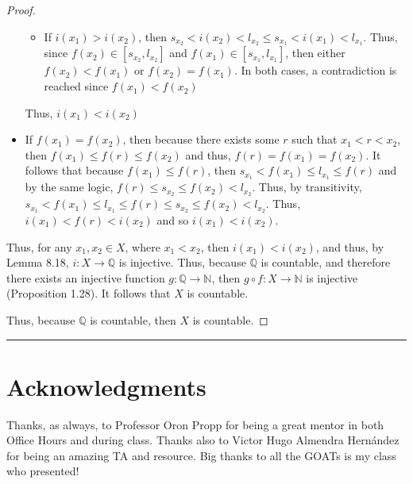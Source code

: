 \documentclass[openany, amssymb, psamsfonts]{amsart}
\newcommand{\bbN}{\mathbb{N}}
\newcommand{\bbQ}{\mathbb{Q}}
\newcommand{\arr}{\longrightarrow}
\theoremstyle{definition}
\numberwithin{equation}{section}
\begin{document}
\begin{proof}
\begin{itemize}
\begin{itemize}
        \item If $i(x_1) > i(x_2)$, then $s_{x_2}< i(x_2)<l_{x_2} \leq s_{x_1}< i(x_1)<l_{x_1}$. Thus, since $f(x_2) \in [s_{x_2}, l_{x_2}]$ and $f(x_1) \in [s_{x_1}, l_{x_1}]$, then either $f(x_2)< f(x_1)$ or $f(x_2) = f(x_1)$. In both cases, a contradiction is reached since $f(x_1)< f(x_2)$
    \end{itemize}
    Thus, $i(x_1)< i(x_2)$
    \item If $f(x_1) = f(x_2)$, then because there exists some $r$ such that $x_1<r<x_2$, then $f(x_1)\leq f(r)\leq f(x_2)$ and thus, $f(r) = f(x_1) = f(x_2)$. It follows that because $f(x_1)\leq f(r)$, then $s_{x_1}<f(x_1)\leq l_{x_1}\leq f(r)$ and by the same logic, $f(r)\leq s_{x_2}\leq f(x_2)<l_{x_2}$. Thus, by transitivity, $s_{x_1}<f(x_1)\leq l_{x_1}\leq f(r) \leq s_{x_2}\leq f(x_2)<l_{x_2}$. Thus, $i(x_1)< f(r)< i(x_2)$ and so $i(x_1)< i(x_2)$. 
\end{itemize}
Thus, for any $x_1, x_2 \in X$, where $x_1<x_2$, then $i(x_1)<i(x_2)$, and thus, by Lemma 8.18, $i\colon X \arr \bbQ$ is injective. Thus, because 
$\bbQ$ is countable, and therefore there exists an injective function $g \colon \bbQ \arr \bbN$, then $g \circ f : X\arr \bbN$ is injective (Proposition 1.28). It follows that $X$ is countable. 


Thus, because $\bbQ$ is countable, then $X$ is countable. 
\end{proof} \vspace{4pt}     \hrule   \vspace{4pt}

\section*{Acknowledgments} 
Thanks, as always, to Professor Oron Propp for being a great mentor in both Office Hours and during class. Thanks also to Victor Hugo Almendra Hernández for being an amazing TA and resource. Big thanks to all the GOATs is my class who presented!
\begin{thebibliography}{9}


\end{thebibliography}
\end{document}
